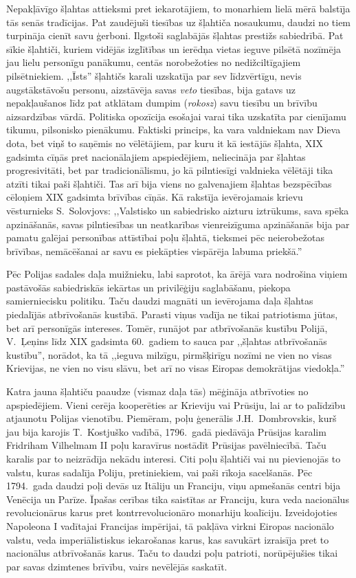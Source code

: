 \documentclass[twoside,a5paper,12pt,fleqn,openany]{extbook}
\newcommand{\pltxti}[1]{\textit{\textpolish{#1}}}
\newcommand{\latxti}[1]{\textit{\textlatin{#1}}}
\begin{document}
Nepakļāvīgo šļahtas attieksmi pret iekarotājiem, to monarhiem lielā mērā balstīja tās senās tradīcijas. Pat zaudējuši tiesības uz šļahtiča nosaukumu, daudzi no tiem turpināja cienīt savu ģerboni. Ilgstoši saglabājās šļahtas prestižs sabiedrībā. Pat sīkie šļahtiči, kuriem vidējās izglītības un ierēdņa vietas ieguve pilsētā nozīmēja jau lielu personīgu panākumu, centās norobežoties no nedižciltīgajiem pilsētniekiem. ,,Īsts'' šļahtičs karali uzskatīja par sev līdzvērtīgu, nevis augstākstāvošu personu, aizstāvēja savas \latxti{veto} tiesības, bija gatavs uz nepakļaušanos līdz pat atklātam dumpim (\pltxti{rokosz}) savu tiesību un brīvību aizsardzības vārdā. Politiska opozīcija esošajai varai tika uzskatīta par cienījamu tikumu, pilsonisko pienākumu. Faktiski princips, ka vara valdniekam nav Dieva dota, bet viņš to saņēmis no vēlētājiem, par kuru it kā iestājās šļahta, XIX gadsimta cīņās pret nacionālajiem apspiedējiem, neliecināja par šļahtas progresivitāti, bet par tradicionālismu, jo kā pilntiesīgi valdnieka vēlētāji tika atzīti tikai paši šļahtiči. Tas arī bija viens no galvenajiem šļahtas bezspēcības cēloņiem XIX gadsimta brīvības cīņās. Kā rakstīja ievērojamais krievu vēsturnieks S.~Solovjovs: ,,Valstisko un sabiedrisko aizturu iztrūkums, sava spēka apzināšanās, savas pilntiesības un neatkarības vienreizīguma apzināšanās bija par pamatu galējai personības attīstībai poļu šļahtā, tieksmei pēc neierobežotas brīvības, nemācēšanai ar savu es piekāpties vispārēja labuma priekšā.''

Pēc Polijas sadales daļa muižnieku, labi saprotot, ka ārējā vara nodrošina viņiem pastāvošās sabiedriskās iekārtas un privilēģiju saglabāšanu, piekopa samierniecisku politiku. Taču daudzi magnāti un ievērojama daļa šļahtas piedalījās atbrīvošanās kustībā. Parasti viņus vadīja ne tikai patriotisma jūtas, bet arī personīgās intereses. Tomēr, runājot par atbrīvošanās kustību Polijā, V.~Ļeņins līdz XIX gadsimta 60.~gadiem to sauca par ,,šļahtas atbrīvošanās kustību'', norādot, ka tā ,,ieguva milzīgu, pirmšķirīgu nozīmi ne vien no visas Krievijas, ne vien no visu slāvu, bet arī no visas Eiropas demokrātijas viedokļa.''

Katra jauna šļahtiču paaudze (vismaz daļa tās) mēģināja atbrīvoties no apspiedējiem. Vieni cerēja kooperēties ar Krieviju vai Prūsiju, lai ar to palīdzību atjaunotu Polijas vienotību. Piemēram, poļu ģenerālis J.H.~Dombrovskis, kurš jau bija karojis T.~Kostjuško vadībā, 1796.~gadā piedāvāja Prūsijas karalim Fridriham Vilhelmam II poļu karavīrus nostādīt Prūsijas pavēlniecībā. Taču karalis par to neizrādīja nekādu interesi. Citi poļu šļahtiči vai nu pievienojās to valstu, kuras sadalīja Poliju, pretiniekiem, vai paši rīkoja sacelšanās. Pēc 1794.~gada daudzi poļi devās uz Itāliju un Franciju, viņu apmešanās centri bija Venēcija un Parīze. Īpašas cerības tika saistītas ar Franciju, kura veda nacionālus revolucionārus karus pret kontrrevolucionāro monarhiju koalīciju. Izveidojoties Napoleona I vadītajai Francijas impērijai, tā pakļāva virkni Eiropas nacionālo valstu, veda imperiālistiskus iekarošanas karus, kas savukārt izraisīja pret to nacionālus atbrīvošanās karus. Taču to daudzi poļu patrioti, norūpējušies tikai par savas dzimtenes brīvību, vairs nevēlējās saskatīt.
\end{document}
